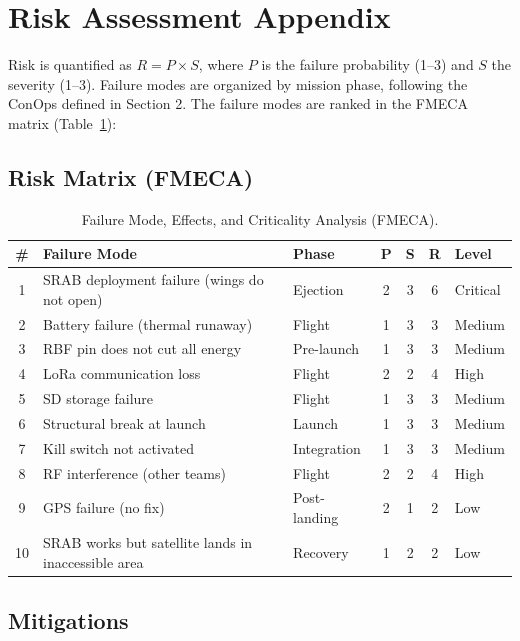 \section*{Risk Assessment Appendix}

Risk is quantified as $R = P \times S$, where $P$ is the failure
probability (1--3) and $S$ the severity (1--3). Failure modes are
organized by mission phase, following the ConOps defined in
Section 2. The failure modes are ranked in the FMECA matrix
(Table~\ref{tab:fmeca}):

\subsection{Risk Matrix (FMECA)}

\begin{table}[htbp]
\centering
\small
\setlength{\tabcolsep}{6pt}
\begin{tabular}{c p{5cm} l c c c l}
\toprule
\textbf{\#} & \textbf{Failure Mode} & \textbf{Phase} & \textbf{P} & \textbf{S} & \textbf{R} & \textbf{Level} \\
\midrule
1 & SRAB deployment failure (wings do not open) & Ejection & 2 & 3 & 6 & Critical \\
2 & Battery failure (thermal runaway) & Flight & 1 & 3 & 3 & Medium \\
3 & RBF pin does not cut all energy & Pre-launch & 1 & 3 & 3 & Medium \\
4 & LoRa communication loss & Flight & 2 & 2 & 4 & High \\
5 & SD storage failure & Flight & 1 & 3 & 3 & Medium \\
6 & Structural break at launch & Launch & 1 & 3 & 3 & Medium \\
7 & Kill switch not activated & Integration & 1 & 3 & 3 & Medium \\
8 & RF interference (other teams) & Flight & 2 & 2 & 4 & High \\
9 & GPS failure (no fix) & Post-landing & 2 & 1 & 2 & Low \\
10 & SRAB works but satellite lands in inaccessible area & Recovery & 1 & 2 & 2 & Low \\
\bottomrule
\end{tabular}
\caption{Failure Mode, Effects, and Criticality Analysis (FMECA).}
\label{tab:fmeca}

\end{table}

\subsection{Mitigations}

